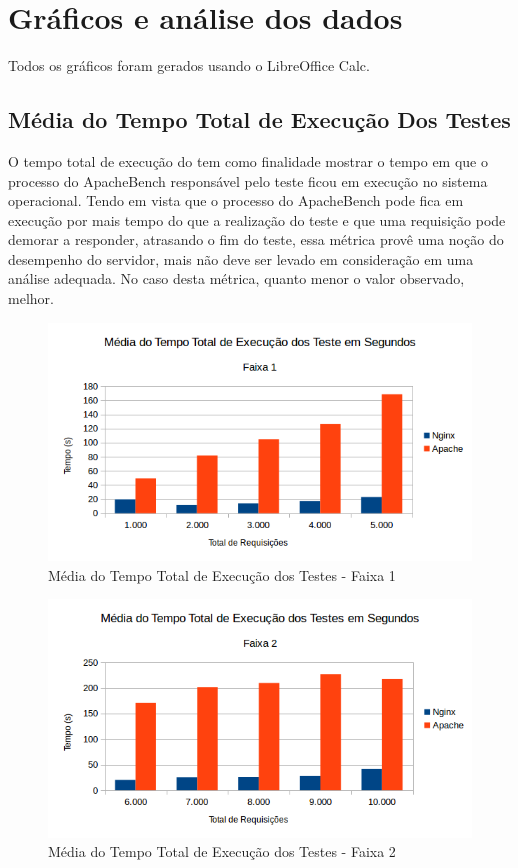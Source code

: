\section{Gráficos e análise dos dados}
Todos os gráficos foram gerados usando o LibreOffice Calc.
\subsection{Média do Tempo Total de Execução Dos Testes}
O tempo total de execução do tem como finalidade mostrar o tempo em que o 
processo do ApacheBench responsável pelo teste ficou em execução no sistema 
operacional. Tendo em vista que o processo do ApacheBench pode fica em execução 
por mais tempo do que a realização do teste e que uma requisição pode demorar a 
responder, atrasando o fim do teste, essa métrica provê uma noção do desempenho 
do servidor, mais não deve ser levado em consideração em uma análise adequada. 
No caso desta métrica, quanto menor o valor observado, melhor.
\begin{figure}[H]
	\centering
	\includegraphics[width=1\linewidth]{graficos/grafico1-f1} 
	\caption{Média do Tempo Total de Execução dos Testes - Faixa 1}
	\label{fig:grafico1-f1}
\end{figure}
\begin{figure}[H]
	\centering
	\includegraphics[width=1\linewidth]{graficos/grafico1-f2} 
	\caption{Média do Tempo Total de Execução dos Testes - Faixa 2}
	\label{fig:grafico1-f2}
\end{figure}
